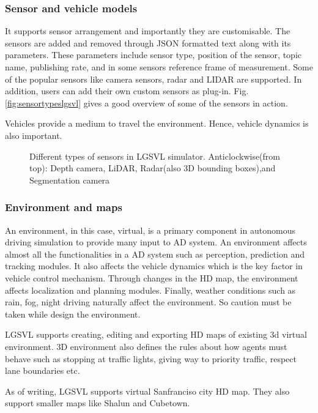 \subsubsection*{Sensor and vehicle models}
It supports sensor arrangement and importantly they are customisable. The sensors are
added and removed through JSON formatted text along with its parameters. These parameters
include sensor type, position of the sensor, topic name, publishing rate, and in some
sensors reference frame of measurement. Some of the popular sensors like camera sensors,
radar and LIDAR are supported. In addition, users can add their own custom sensors as
plug-in. Fig.\ref{fig:sensortypeslgsvl} gives a good overview of some of the sensors in action.

Vehicles provide a medium to travel the environment. Hence, vehicle dynamics is also
important.

\begin{figure}[!ht]
    \centering
    \def\svgwidth{0.9\columnwidth}
    
    \caption{Different types of sensors in LGSVL simulator. Anticlockwise(from top): Depth
    camera, LiDAR, Radar(also 3D bounding boxes),and Segmentation camera}
    \label{fig:sensortypeslgsvlnew}
\end{figure}

\subsubsection*{Environment and maps}
An environment, in this case, virtual, is a primary component in autonomous driving
simulation to provide many input to AD system. An environment affects almost all the
functionalities in a AD system such as perception, prediction and tracking modules. It
also affects the vehicle dynamics which is the key factor in vehicle control mechanism.
Through changes in the HD map, the environment affects localization and planning modules.
Finally, weather conditions such as rain, fog, night driving naturally affect the
environment. So caution must be taken while design the environment.

LGSVL supports creating, editing and exporting HD maps of existing 3d virtual environment.
3D environment also defines the rules about how agents must behave such as stopping at traffic
lights, giving way to priority traffic, respect lane boundaries etc.

As of writing, LGSVL supports virtual Sanfranciso city HD map. They also support smaller
maps like Shalun and Cubetown.

